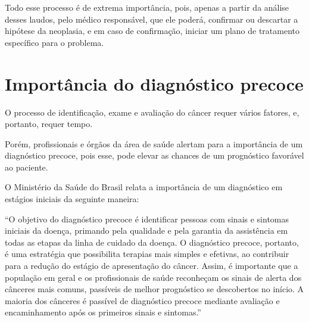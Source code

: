 Todo esse processo é de extrema importância, pois, apenas a partir da análise desses laudos,
pelo médico responsável, que ele poderá, confirmar ou descartar a hipótese da neoplasia, e em caso de confirmação,
iniciar um plano de tratamento específico para o problema.


\section{\textbf{Importância do diagnóstico precoce}}

O processo de identificação, exame e avaliação do câncer requer vários fatores, e, portanto, requer tempo.

Porém, profissionais e órgãos da área de saúde alertam para a importância de um diagnóstico precoce,
pois esse, pode elevar as chances de um prognóstico favorável ao paciente.

O Ministério da Saúde do Brasil relata a importância de um diagnóstico em estágios iniciais da seguinte maneira:

“O objetivo do diagnóstico precoce é identificar pessoas com sinais e sintomas iniciais da doença,
primando pela qualidade e pela garantia da assistência em todas as etapas da linha de cuidado da doença.
O diagnóstico precoce, portanto, é uma estratégia que possibilita terapias mais simples e efetivas,
ao contribuir para a redução do estágio de apresentação do câncer.
Assim, é importante que a população em geral e os profissionais de saúde reconheçam os sinais de alerta dos cânceres mais comuns,
passíveis de melhor prognóstico se descobertos no início.
A maioria dos cânceres é passível de diagnóstico precoce mediante avaliação e encaminhamento após os primeiros sinais e sintomas.”
\cite{DIAGNOSTICO}

